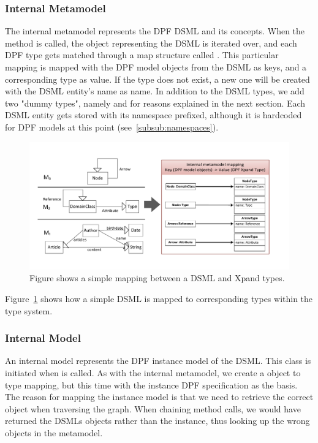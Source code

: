 \subsubsection{Internal Metamodel}
The internal metamodel represents the DPF DSML and its concepts. When the method  is called, the  object representing the DSML is iterated over, and each DPF type gets matched through a map structure called . This particular mapping is mapped with the DPF model objects from the DSML as keys, and a corresponding type as value. If the type does not exist, a new one will be created with the DSML entity's name as name. In addition to the DSML types, we add two "dummy types", namely  and  for reasons explained in the next section. Each DSML entity gets stored with its namespace prefixed, although it is hardcoded for DPF models at this point (see~\ref{subsub:namespaces}).
\begin{figure}[h]
  \centering
  \centerline{\includegraphics[scale=0.8]{images/dpf_to_type_mapping.pdf}}
  \caption[Mapping from DPF types to DPF Xpand metamodel types]{Figure shows a simple mapping between a DSML and Xpand types.}
  \label{fig:dpf_to_type_mapping}
\end{figure}

Figure~\ref{fig:dpf_to_type_mapping} shows how a simple DSML is mapped to corresponding types within the type system. 

\subsubsection{Internal Model}
An internal model represents the DPF instance model of the DSML. This class is initiated when  is called. As with the internal metamodel, we create a object to type mapping, but this time with the instance DPF specification as the basis. The reason for mapping the instance model is that we need to retrieve the correct object when traversing the graph. When chaining method calls, we would have returned the DSMLs objects rather than the instance, thus looking up the wrong objects in the metamodel.


